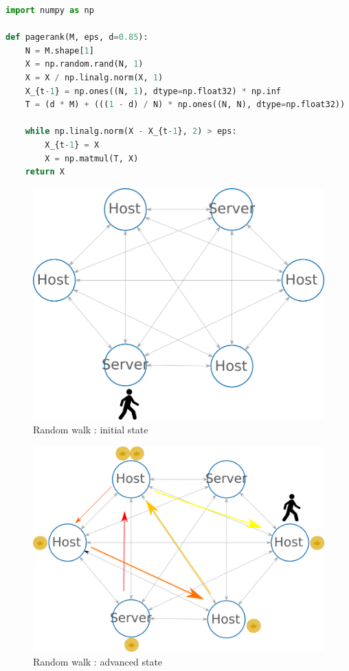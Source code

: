 \documentclass[10pt,a4paper,oneside]{article}
\begin{document}
\begin{lstlisting}[language=Python, caption=Python Power Method]
import numpy as np

def pagerank(M, eps, d=0.85):
    N = M.shape[1]
    X = np.random.rand(N, 1)
    X = X / np.linalg.norm(X, 1)
    X_{t-1} = np.ones((N, 1), dtype=np.float32) * np.inf
    T = (d * M) + (((1 - d) / N) * np.ones((N, N), dtype=np.float32))
    
    while np.linalg.norm(X - X_{t-1}, 2) > eps: 
        X_{t-1} = X
        X = np.matmul(T, X)
    return X

\end{lstlisting}

\begin{figure}[!h]
\centering
\includegraphics[scale=0.5]{./images/PNG/GraphesRandomWalk.png}
\caption{Random walk : initial state}
\label{graphrwb}
\end{figure}

\begin{figure}[!h]
\centering
\includegraphics[scale=0.5]{./images/PNG/GraphesRandomWalk2.png}
\caption{Random walk : advanced state}
\label{graphrw}
\end{figure}
\end{document}
